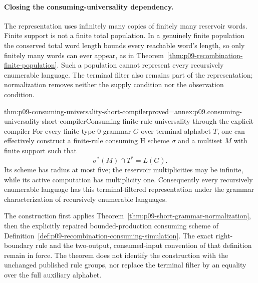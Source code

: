 \paragraph{Closing the consuming-universality dependency.}

The representation uses infinitely many copies of finitely many reservoir
words. Finite support is not a finite total population. In a genuinely finite
population the conserved total word length bounds every reachable word's
length, so only finitely many words can ever appear, as in
Theorem~\ref{thm:p09-recombination-finite-population}. Such a population
cannot represent every recursively enumerable language. The terminal filter
also remains part of the representation; normalization removes neither
the supply condition nor the observation condition.

\begin{hbtheorem}{thm:p09-consuming-universality-short-compiler}{proved=annex:p09.consuming-universality-short-compiler}{Consuming finite-rule universality through the explicit compiler}
For every finite type-0 grammar \(G\) over terminal alphabet \(T\),
one can effectively construct a finite-rule consuming H scheme \(\sigma\)
and a multiset \(M\) with finite support such that
\[
 \sigma^*(M)\cap T^*=L(G).
\]
Its scheme has radius at most five; the reservoir multiplicities may be
infinite, while its active computation has multiplicity one.
Consequently every recursively enumerable language has this terminal-filtered
representation under the grammar characterization of recursively enumerable
languages.
\end{hbtheorem}

The construction first applies
Theorem~\ref{thm:p09-short-grammar-normalization}, then the explicitly
repaired bounded-production consuming scheme of
Definition~\ref{def:p09-recombination-consuming-simulation}.
The exact right-boundary rule and the two-output, consumed-input convention
of that definition remain in force. The theorem does not identify the
construction with the unchanged published rule groups, nor replace the
terminal filter by an equality over the full auxiliary alphabet.
